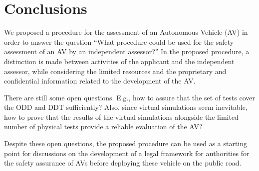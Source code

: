 \section{Conclusions}
\label{sec:conclusions}

We proposed a procedure for the assessment of an Autonomous Vehicle (AV) in order to answer the question ``What procedure could be used for the safety assessment of an AV by an independent assessor?''
In the proposed procedure, a distinction is made between activities of the applicant and the independent assessor, while considering the limited resources and the proprietary and confidential information related to the development of the AV.

There are still some open questions. E.g., how to assure that the set of tests cover the ODD and DDT sufficiently? Also, since virtual simulations seem inevitable, how to prove that the results of the virtual simulations alongside the limited number of physical tests provide a reliable evaluation of the AV?

Despite these open questions, the proposed procedure can be used as a starting point for discussions on the development of a legal framework for authorities for the safety assurance of AVs before deploying these vehicle on the public road. 
